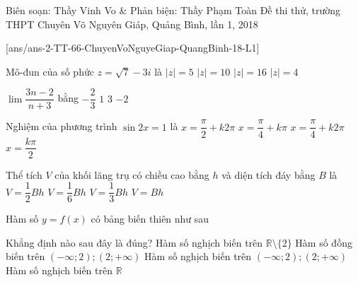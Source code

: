 \begin{name}
{Biên soạn: Thầy Vinh Vo \& Phản biện: Thầy Phạm Toàn}
{Đề thi thử, trường THPT Chuyên Võ Nguyên Giáp, Quảng Bình, lần 1, 2018}
\end{name}
\setcounter{ex}{0}
[ans/ans-2-TT-66-ChuyenVoNguyeGiap-QuangBinh-18-L1]
\begin{ex}%
Mô-đun của số phức $ z = \sqrt{7} - 3i $ là
\choice
{$ |z| = 5 $}
{$ |z| = 10 $}
{$ |z| = 16 $}
{\True $ |z| = 4 $}
\end{ex}
\begin{ex}%
$ \lim \dfrac{3n-2}{n+3} $ bằng
	\choice
	{$ - \dfrac{2}{3} $}
	{$ 1 $}
	{\True $ 3 $}
	{$ - 2 $}
\end{ex}
\begin{ex}%
Nghiệm của phương trình $ \sin 2x = 1 $ là 	
	\choice
	{$ x = \dfrac{\pi}{2} + k2\pi $}
	{\True $ x = \dfrac{\pi}{4} + k\pi $}
	{$ x = \dfrac{\pi}{4} + k2\pi $}
	{$ x = \dfrac{k\pi}{2} $}
\end{ex}
\begin{ex}%
Thể tích $ V $ của khối lăng trụ có chiều cao bằng $ h $ và diện tích đáy bằng $ B $ là	
	\choice
	{$ V = \dfrac{1}{2}Bh $}
	{$ V = \dfrac{1}{6}Bh $}
	{$ V = \dfrac{1}{3}Bh $}
	{\True $ V = Bh $}
\end{ex}
\begin{ex}%
Hàm số $ y = f(x) $ có bảng biến thiên như sau
\begin{center}
\end{center}
Khẳng định nào sau đây là đúng?		
	\choice
	{Hàm số nghịch biến trên $ \mathbb{R} \setminus \{2\} $}
	{Hàm số đồng biến trên $ (-\infty;2); (2;+\infty) $}
	{\True Hàm số nghịch biến trên $ (-\infty;2); (2;+\infty) $}
	{Hàm số nghịch biến trên $ \mathbb{R} $}
\end{ex}
